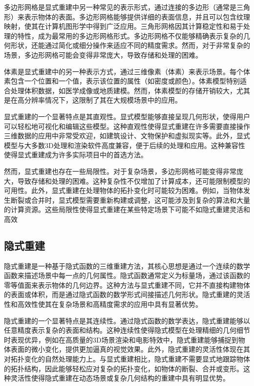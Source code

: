 \documentclass{xduugthesis}
\begin{document}
多边形网格是显式重建中另一种常见的表示形式，通过连接的多边形（通常是三角形）来表示物体的表面。多边形网格能够提供详细的表面信息，并且可以包含纹理映射，使其在计算机图形学中得到广泛应用。三角形网格因其计算稳定性和易于处理的特性，成为最常用的多边形网格形式。多边形网格不仅能够精确表示复杂的几何形状，还能通过简化或细分操作来适应不同的精度需求。然而，对于非常复杂的场景，多边形网格可能会变得非常庞大，导致存储和处理的困难。

体素是显式重建中的另一种表示方式，通过三维像素（体素）来表示场景。每个体素包含一个位置和一个值，表示该位置的属性（如密度或颜色）。体素模型特别适合处理体积数据，如医学成像或地质建模。然而，体素模型的存储开销较大，尤其是在高分辨率情况下，这限制了其在大规模场景中的应用。

显式重建的一个显著特点是其直观性。显式模型能够直接呈现几何形状，使得用户可以轻松地可视化和编辑这些模型。这种直观性使得显式重建在许多需要直接操作三维数据的应用中非常受欢迎，如建筑设计、文物保护和虚拟现实等。此外，显式模型与大多数3D处理和渲染软件高度兼容，便于后续的处理和应用。这种兼容性使得显式重建成为许多实际项目中的首选方法。

然而，显式重建也存在一些局限性。对于复杂场景，多边形网格可能变得非常庞大，导致存储和处理的困难。这种复杂性不仅增加了计算成本，还可能限制模型的可用性。此外，显式重建在处理物体的拓扑变化时可能较为困难。例如，当物体发生断裂或合并时，显式模型需要重新构建或调整，这可能涉及到复杂的算法和大量的计算资源。这些局限性使得显式重建在某些特定场景下可能不如隐式重建灵活和高效
\subsection{隐式重建}
隐式重建是一种基于隐式函数的三维重建方法，其核心思想是通过一个连续的数学函数来描述场景中每一点的几何属性。隐式函数通常定义为标量场，通过该函数的零等值面来表示物体的几何边界。这种方法与显式重建不同，它并不直接构建物体的表面或体积，而是通过隐式函数的数学形式间接描述几何形状。隐式重建的灵活性和高效性使其在复杂场景和高精度需求的应用中具有显著优势。

隐式重建的一个显著特点是其连续性。通过隐式函数的数学表达，隐式重建能够以任意精度表示复杂的表面和结构。这种连续性使得隐式模型在处理精细的几何细节时表现优异，例如在高质量的3D场景渲染和电影特效中，隐式重建能够捕捉到物体表面的微小变化，提供更加逼真的视觉效果。此外，隐式重建的灵活性体现在其对拓扑变化的自然处理能力上。与显式重建相比，隐式重建不需要显式地跟踪物体的拓扑结构，因此能够轻松应对复杂的拓扑变化，如物体的断裂、合并或变形。这种灵活性使得隐式重建在动态场景或复杂几何结构的重建中具有明显优势。
\end{document}
